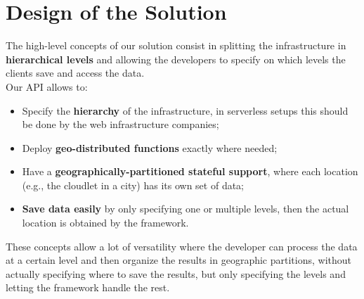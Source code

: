 \chapter{Design of the Solution}
\label{ch:design-of-the-solution}

The high-level concepts of our solution consist in splitting the infrastructure in \textbf{hierarchical levels} and allowing the developers to specify on which levels the clients save and access the data.
\\Our API allows to:
\begin{itemize}
    \item Specify the \textbf{hierarchy} of the infrastructure, in serverless setups this should be done by the web infrastructure companies;
    \item Deploy \textbf{geo-distributed functions} exactly where needed;
    \item Have a \textbf{geographically-partitioned stateful support}, where each location (e.g., the cloudlet in a city) has its own set of data;
    \item \textbf{Save data easily} by only specifying one or multiple levels, then the actual location is obtained by the framework.
\end{itemize}

These concepts allow a lot of versatility where the developer can process the data at a certain level and then organize the results in geographic partitions, without actually specifying where to save the results, but only specifying the levels and letting the framework handle the rest.

